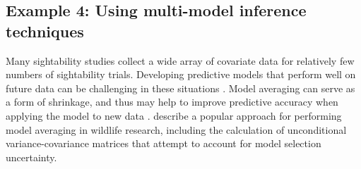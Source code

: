 \documentclass[nojss]{jss}
\begin{document}
\subsection{Example 4:  Using multi-model inference techniques}

Many sightability studies collect a wide array of covariate data for
relatively few numbers of sightability trials.  Developing
predictive models that perform well on future data can be
challenging in these situations \citep{GiudFieb2011}. Model
averaging can serve as a form of shrinkage, and thus may help to
improve predictive accuracy when applying the model to new data
\citep{burnham2002model, GiudFieb2011}. \citet{burnham2002model}
describe a popular approach for performing model averaging in
wildlife research, including the calculation of unconditional
variance-covariance matrices that attempt to account for model
selection uncertainty.
\end{document}
